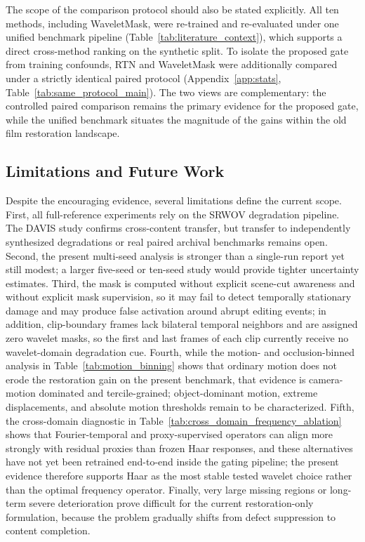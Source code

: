{The scope of the comparison protocol should also be stated explicitly. All ten methods, including WaveletMask, were re-trained and re-evaluated under one unified benchmark pipeline (Table~\ref{tab:literature_context}), which supports a direct cross-method ranking on the synthetic split. To isolate the proposed gate from training confounds, RTN and WaveletMask were additionally compared under a strictly identical paired protocol (Appendix~\ref{app:stats}, Table~\ref{tab:same_protocol_main}). The two views are complementary: the controlled paired comparison remains the primary evidence for the proposed gate, while the unified benchmark situates the magnitude of the gains within the old film restoration landscape.

\subsection{Limitations and Future Work}\label{subsec:limitations}

Despite the encouraging evidence, several limitations define the current scope. First, all full-reference experiments rely on the SRWOV degradation pipeline. The DAVIS study confirms cross-content transfer, but transfer to independently synthesized degradations or real paired archival benchmarks remains open. Second, the present multi-seed analysis is stronger than a single-run report yet still modest; a larger five-seed or ten-seed study would provide tighter uncertainty estimates. Third, the mask is computed without explicit scene-cut awareness and without explicit mask supervision, so it may fail to detect temporally stationary damage and may produce false activation around abrupt editing events; in addition, clip-boundary frames lack bilateral temporal neighbors and are assigned zero wavelet masks, so the first and last frames of each clip currently receive no wavelet-domain degradation cue. Fourth, while the motion- and occlusion-binned analysis in Table~\ref{tab:motion_binning} shows that ordinary motion does not erode the restoration gain on the present benchmark, that evidence is camera-motion dominated and tercile-grained; object-dominant motion, extreme displacements, and absolute motion thresholds remain to be characterized. Fifth, the cross-domain diagnostic in Table~\ref{tab:cross_domain_frequency_ablation} shows that Fourier-temporal and proxy-supervised operators can align more strongly with residual proxies than frozen Haar responses, and these alternatives have not yet been retrained end-to-end inside the gating pipeline; the present evidence therefore supports Haar as the most stable tested wavelet choice rather than the optimal frequency operator. Finally, very large missing regions or long-term severe deterioration prove difficult for the current restoration-only formulation, because the problem gradually shifts from defect suppression to content completion.

}
